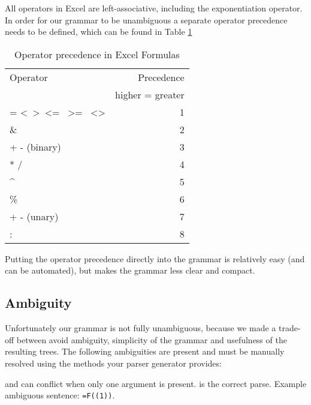 \documentclass[conference]{IEEEtran}
\begin{document}
All operators in Excel are left-associative, including the exponentiation operator. In order for our grammar to be unambiguous a separate operator precedence needs to be defined, which can be found in Table \ref{table:operatorprec}

\begin{table}
\label{table:operatorprec}
\caption{Operator precedence in Excel Formulas}
\begin{tabular}{lr}
Operator                                                                & Precedence \\
 & higher = greater \\
= \textless \  \textgreater \  \textless= \  \textgreater= \  \textless\textgreater & 1          \\
\&                                                                      & 2          \\
+ - (binary)                                                            & 3          \\
* /                                                                     & 4          \\
\textasciicircum                                                        & 5          \\
\%                                                                      & 6          \\
+ - (unary)                                                             & 7          \\
: \texttt{\char32}                                                             & 8         
\end{tabular}
\end{table}

Putting the operator precedence directly into the grammar is relatively easy (and can be automated), but makes the grammar less clear and compact.

\subsection{Ambiguity}

Unfortunately our grammar is not fully unambiguous, because we made a trade-off between avoid ambiguity, simplicity of the grammar and usefulness of the resulting trees. The following ambiguities are present and must be manually resolved using the methods your parser generator provides:

 and  can conflict when only one argument is present.  is the correct parse. Example ambiguous sentence: \texttt{=F((1))}.
\end{document}
